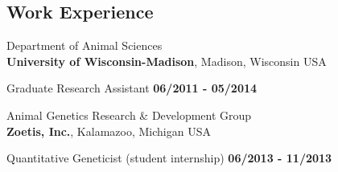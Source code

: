\documentclass[margin,line,10pt]{res}
\begin{document}
\begin{resume}
  


\vspace{0.4cm}
\section{\sc Work \phantom{1cm} Experience}
Department of Animal Sciences\\
{\bf University of Wisconsin-Madison}, Madison, Wisconsin USA
\vspace{-.35cm}

Graduate Research Assistant   \hfill {\bf 06/2011 - 05/2014}\\
\vspace{-.4cm}

Animal Genetics Research \& Development  Group \\
{\bf Zoetis, Inc.}, Kalamazoo, Michigan USA

\vspace{-.35cm}

Quantitative Geneticist (student internship)   \hfill {\bf 06/2013 - 11/2013}\\








\vspace{0.5cm}

\end{resume}
\end{document}
